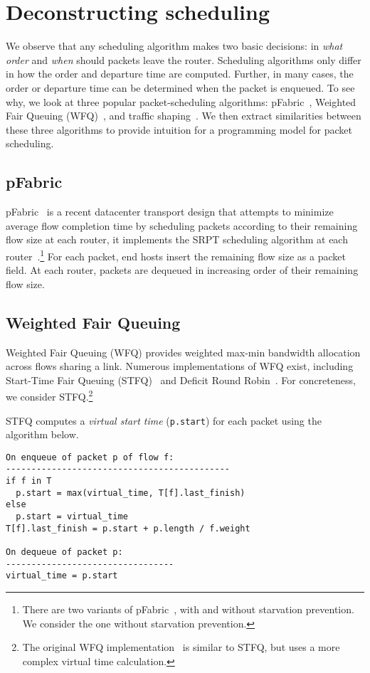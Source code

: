 \section{Deconstructing scheduling}
\label{s:deconstruct}
We observe that any scheduling algorithm makes two basic decisions: in  {\em
what order} and {\em when} should packets leave the router.  Scheduling
algorithms only differ in how the order and departure time are computed.
Further, in many cases, the order or departure time can be determined when the
packet is enqueued.  To see why, we look at three popular packet-scheduling
algorithms: pFabric~\cite{pFabric}, Weighted Fair Queuing (WFQ)~\cite{wfq}, and
traffic shaping~\cite{tbf}. We then extract similarities between these three
algorithms to provide intuition for a programming model for packet scheduling.

\subsection{pFabric}
pFabric~\cite{pFabric} is a recent datacenter transport design that attempts to
minimize average flow completion time by scheduling packets according to their
remaining flow size at each router, \ie it implements the SRPT scheduling
algorithm at each router~\cite{srpt}.\footnote{There are two variants of
pFabric~\cite{pFabric}, with and without starvation prevention.  We consider
the one without starvation prevention.} For each packet, end hosts insert the
remaining flow size as a packet field. At each router, packets are dequeued in
increasing order of their remaining flow size.

\subsection{Weighted Fair Queuing}
\label{ss:decon_wfq}
Weighted Fair Queuing (WFQ) provides weighted max-min bandwidth allocation
across flows sharing a link. Numerous implementations of WFQ exist, including
Start-Time Fair Queuing (STFQ)~\cite{stfq} and Deficit Round Robin~\cite{drr}.
For concreteness, we consider STFQ.\footnote{The original WFQ
implementation~\cite{wfq} is similar to STFQ, but uses a more complex virtual
time calculation.}

STFQ computes a {\em virtual start time} ({\tt p.start}) for each packet using
the algorithm below. 
\begin{lstlisting}[style=customc]
On enqueue of packet p of flow f:
--------------------------------------------
if f in T
  p.start = max(virtual_time, T[f].last_finish)
else
  p.start = virtual_time
T[f].last_finish = p.start + p.length / f.weight

On dequeue of packet p:
---------------------------------
virtual_time = p.start
\end{lstlisting}


